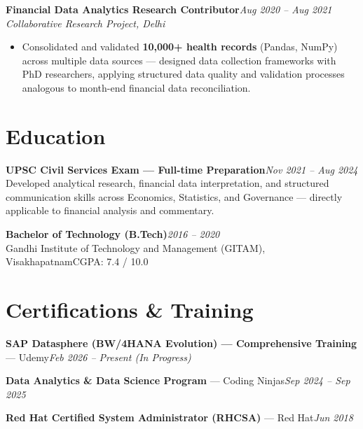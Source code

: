 \documentclass[10pt, letterpaper]{article}
\newcommand{\role}[3]{%
  \vspace{2pt}%
  {\bfseries #1}\hfill{\small\color{muted}\textit{#3}}\\[-2pt]%
  {\small\color{muted}\textit{#2}}%
}
\begin{document}
\vspace{1pt}

\role{Financial Data Analytics Research Contributor}{Collaborative Research Project, Delhi}{Aug 2020 – Aug 2021}

\begin{itemize}
  \item Consolidated and validated \textbf{10,000+ health records} (Pandas, NumPy) across multiple data sources — designed data collection frameworks with PhD researchers, applying structured data quality and validation processes analogous to month-end financial data reconciliation.
\end{itemize}


\section{Education}

{\bfseries UPSC Civil Services Exam — Full-time Preparation}\hfill{\small\color{muted}\textit{Nov 2021 – Aug 2024}}\\
{\small\color{muted}Developed analytical research, financial data interpretation, and structured communication skills across Economics, Statistics, and Governance — directly applicable to financial analysis and commentary.}

\vspace{2pt}
{\bfseries Bachelor of Technology (B.Tech)}\hfill{\small\color{muted}\textit{2016 – 2020}}\\
{\small\color{muted}Gandhi Institute of Technology and Management (GITAM), Visakhapatnam\hfill CGPA: 7.4 / 10.0}

\section{Certifications \& Training}

{\bfseries SAP Datasphere (BW/4HANA Evolution) — Comprehensive Training} — Udemy\hfill{\small\color{muted}\textit{Feb 2026 – Present \emph{(In Progress)}}}

\vspace{1pt}
{\bfseries Data Analytics \& Data Science Program} — Coding Ninjas\hfill{\small\color{muted}\textit{Sep 2024 – Sep 2025}}

\vspace{1pt}
{\bfseries Red Hat Certified System Administrator (RHCSA)} — Red Hat\hfill{\small\color{muted}\textit{Jun 2018}}

\end{document}
